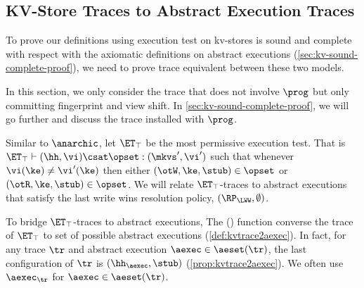 \subsection{KV-Store Traces to Abstract Execution Traces}
\label{sec:kvtrace2aexec}

To prove our definitions using execution test on kv-stores 
is sound and complete with respect with the axiomatic definitions on abstract executions (\cref{sec:kv-sound-complete-proof}),
we need to prove trace equivalent between these two models.

In this section, we only consider the trace that does not involve \( \prog \) but only committing fingerprint and view shift.
In \cref{sec:kv-sound-complete-proof}, we will go further and discuss the trace installed with \( \prog \).

Similar to \(\anarchic\), let $\ET_\top$ be the most permissive execution test.
That is $\ET_\top \vdash (\hh, \vi) \csat \opset: (\mkvs',\vi')$ 
such that whenever $\vi(\ke) \neq \vi'(\ke)$ then either $(\otW, \ke, \stub) \in \opset$ or $(\otR, \ke, \stub) \in \opset$.
We will relate $\ET_{\top}$-traces to abstract executions that satisfy the last write wins resolution policy, \ie \( (\RP_\LWW, \emptyset) \).

To bridge $\ET_{\top}$-traces to abstract executions, 
The \aeset(\tr) function converse the trace of \( \ET_\top \) to set of possible abstract executions (\cref{def:kvtrace2aexec}).
In fact, for any trace \( \tr \) and abstract execution $\aexec \in \aeset(\tr)$, 
the last configuration of $\tr$ is $(\hh_{\aexec}, \stub)$ (\cref{prop:kvtrace2aexec}).
We often use \( \aexec_\tr \) for \( \aexec \in \aeset(\tr) \).

